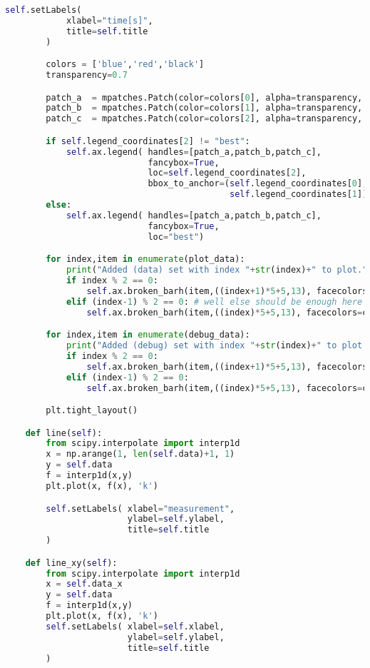 \begin{lstlisting}[language=Python,caption=myplot.py]
        self.setLabels(
            xlabel="time[s]",
            title=self.title
        )

        colors = ['blue','red','black']
        transparency=0.7

        patch_a  = mpatches.Patch(color=colors[0], alpha=transparency, label="data sent")
        patch_b  = mpatches.Patch(color=colors[1], alpha=transparency, label='ack sent')
        patch_c  = mpatches.Patch(color=colors[2], alpha=transparency, label="ack received")

        if self.legend_coordinates[2] != "best":
            self.ax.legend( handles=[patch_a,patch_b,patch_c],
                            fancybox=True,
                            loc=self.legend_coordinates[2],
                            bbox_to_anchor=(self.legend_coordinates[0],
                                            self.legend_coordinates[1]))
        else:
            self.ax.legend( handles=[patch_a,patch_b,patch_c],
                            fancybox=True,
                            loc="best")

        for index,item in enumerate(plot_data):
            print("Added (data) set with index "+str(index)+" to plot.")
            if index % 2 == 0:
                self.ax.broken_barh(item,((index+1)*5+5,13), facecolors=colors[0], alpha=0.5)
            elif (index-1) % 2 == 0: # well else should be enough here :)
                self.ax.broken_barh(item,((index)*5+5,13), facecolors=colors[1], alpha=0.5)

        for index,item in enumerate(debug_data):
            print("Added (debug) set with index "+str(index)+" to plot.")
            if index % 2 == 0:
                self.ax.broken_barh(item,((index+1)*5+5,13), facecolors=colors[2], alpha=0.5)
            elif (index-1) % 2 == 0:
                self.ax.broken_barh(item,((index)*5+5,13), facecolors=colors[2], alpha=0.5)

        plt.tight_layout()

    def line(self):
        from scipy.interpolate import interp1d
        x = np.arange(1, len(self.data)+1, 1)
        y = self.data
        f = interp1d(x,y)
        plt.plot(x, f(x), 'k')

        self.setLabels( xlabel="measurement",
                        ylabel=self.ylabel,
                        title=self.title
        )

    def line_xy(self):
        from scipy.interpolate import interp1d
        x = self.data_x
        y = self.data
        f = interp1d(x,y)
        plt.plot(x, f(x), 'k')
        self.setLabels( xlabel=self.xlabel,
                        ylabel=self.ylabel,
                        title=self.title
        )


\end{lstlisting}
